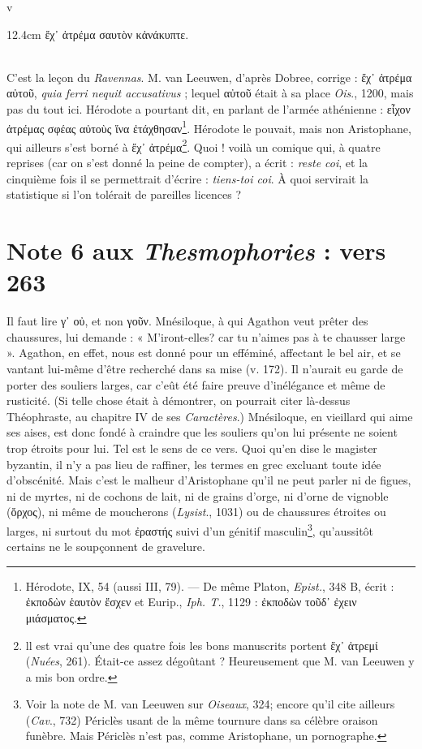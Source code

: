 \documentclass{book}%
\newcommand{\italique}[1]{\textit{#1}}%
\newcommand{\espace}[1]{\hspace{#1}}%
\newlength{\larg}%
\newcommand{\fantome}{{\color{white}v}}
\newcommand{\Note}[1]{\section*{#1}%
\addcontentsline{toc}{section}{#1}}
\newcommand{\note}[1]{\footnote{#1}}
\newcommand{\citComm}[1]{\fantome\\
\espace{1cm}\begin{minipagewithmarginpars}{12.4cm}%
#1
\end{minipagewithmarginpars}%
}
\begin{document}
\citComm{ἔχ᾽ ἀτρέμα σαυτὸν κἀνάκυπτε.}\\

C'est la leçon du \italique{Ravennas}. M. van Leeuwen, d'après Dobree, corrige : ἔχ᾽ ἀτρέμα αὐτοῦ, \italique{quia ferri nequit accusativus} ; lequel αὐτοῦ était à sa place \italique{Ois}., 1200, mais pas du tout ici. 
Hérodote a pourtant dit, en parlant de l'armée athénienne : εἶχον ἀτρέμας σφέας αὐτοὺς ἵνα ἐτάχθησαν\note{Hérodote, IX, 54 (aussi III, 79). — De même Platon, \italique{Epist.}, 348 B, écrit : ἐκποδὼν ἑαυτὸν ἔσχεν et Eurip., \italique{Iph. T.}, 1129 : ἐκποδὼν τοῦδ᾽ ἐχειν μιάσματος.}. Hérodote le pouvait, mais non Aristophane, qui ailleurs s'est borné à ἔχ᾽ ἀτρέμα\note{ll est vrai qu'une des quatre fois les bons manuscrits portent ἔχ᾽ ἀτρεμί (\italique{Nuées}, 261). Était-ce assez dégoûtant ? Heureusement que M. van Leeuwen y a mis bon ordre.}. Quoi ! voilà un comique qui, à quatre reprises (car on s'est donné la peine de compter), a écrit : \italique{reste coi}, et la cinquième fois il se permettrait d'écrire : \italique{tiens-toi coi}. À quoi servirait la statistique si l'on tolérait de pareilles licences ?

\Note{Note 6 aux \italique{Thesmophories} : vers 263}

Il faut lire γ᾽ οὐ, et non γοῦν. Mnésiloque, à qui Agathon veut prêter des chaussures, lui demande : « M'iront-elles? car tu n'aimes pas à te chausser large ». Agathon, en effet, nous est donné pour un efféminé, affectant le bel air, et se vantant lui-même d'être recherché dans sa mise (v. 172). 
Il n'aurait eu garde de porter des souliers larges, car c'eût été faire preuve d'inélégance et même de rusticité. (Si telle chose était à démontrer, on pourrait citer là-dessus Théophraste, au chapitre IV de ses \italique{Caractères}.) 
Mnésiloque, en vieillard qui aime ses aises, est donc fondé à craindre que les souliers qu'on lui présente ne soient trop étroits pour lui. Tel est le sens de ce vers. Quoi qu'en dise le magister byzantin, il n'y a pas lieu de raffiner, les termes en grec excluant toute idée d'obscénité. 
Mais c'est le malheur d'Aristophane qu'il ne peut parler ni de figues, ni de myrtes, ni de cochons de lait, ni de grains d'orge, ni d'orne de vignoble (ὄρχος), ni même de moucherons (\italique{Lysist}., 1031) ou de chaussures étroites ou larges, ni surtout du mot ἐραστής suivi d'un génitif masculin\note{Voir la note de M. van Leeuwen sur \italique{Oiseaux}, 324; encore qu'il cite ailleurs (\italique{Cav}., 732) Périclès usant de la même tournure dans sa célèbre oraison funèbre. Mais Périclès n'est pas, comme Aristophane, un pornographe.}, qu'aussitôt certains ne le soupçonnent de gravelure. 
\end{document}
